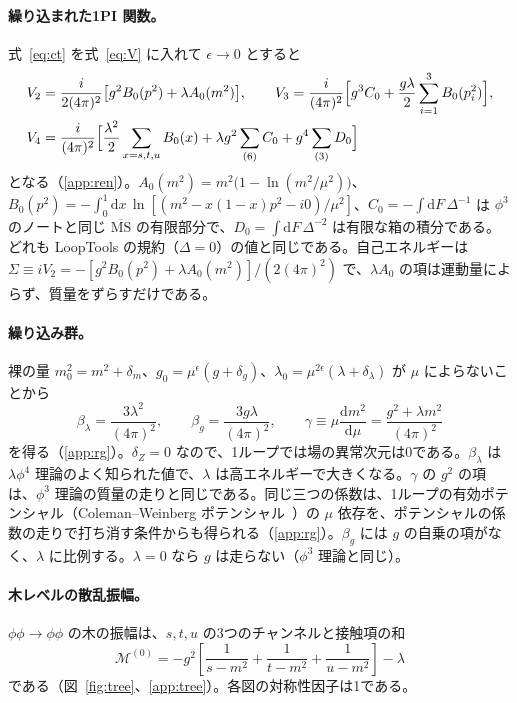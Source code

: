\documentclass[a4paper,10pt]{ltjsarticle}
\newcommand{\dd}{\mathrm{d}}
\begin{document}
\paragraph{繰り込まれた1PI 関数。}式~\eqref{eq:ct} を式~\eqref{eq:V} に入れて $\epsilon\to0$ とすると
\begin{equation}
\begin{aligned}
V_2&=\frac{i}{2(4\pi)^2}\bigl[g^2B_0(p^2)+\lambda A_0(m^2)\bigr],\qquad
V_3=\frac{i}{(4\pi)^2}\Bigl[g^3C_0+\frac{g\lambda}{2}\sum_{i=1}^3B_0(p_i^2)\Bigr],\\
V_4&=\frac{i}{(4\pi)^2}\Bigl[\frac{\lambda^2}{2}\sum_{x=s,t,u}B_0(x)+\lambda g^2\sum_{(6)}C_0+g^4\sum_{(3)}D_0\Bigr]
\end{aligned}
\label{eq:VR}
\end{equation}
となる（\ref{app:ren}）。$A_0(m^2)=m^2\bigl(1-\ln(m^2/\mu^2)\bigr)$、$B_0(p^2)=-\int_0^1\dd x\,\ln[(m^2-x(1-x)p^2-i0)/\mu^2]$、$C_0=-\int\dd F\,\Delta^{-1}$ は $\phi^3$ のノートと同じ $\overline{\mathrm{MS}}$ の有限部分で、$D_0=\int\dd F\,\Delta^{-2}$ は有限な箱の積分である。どれも LoopTools の規約（$\Delta=0$）の値と同じである。自己エネルギーは $\Sigma\equiv iV_2=-[g^2B_0(p^2)+\lambda A_0(m^2)]/(2(4\pi)^2)$ で、$\lambda A_0$ の項は運動量によらず、質量をずらすだけである。

\paragraph{繰り込み群。}裸の量 $m_0^2=m^2+\delta_m$、$g_0=\mu^\epsilon(g+\delta_g)$、$\lambda_0=\mu^{2\epsilon}(\lambda+\delta_\lambda)$ が $\mu$ によらないことから
\begin{equation}
\beta_\lambda=\frac{3\lambda^2}{(4\pi)^2},\qquad
\beta_g=\frac{3g\lambda}{(4\pi)^2},\qquad
\gamma\equiv\mu\frac{\dd m^2}{\dd\mu}=\frac{g^2+\lambda m^2}{(4\pi)^2}
\label{eq:rge}
\end{equation}
を得る（\ref{app:rg}）。$\delta_Z=0$ なので、1ループでは場の異常次元は0である。$\beta_\lambda$ は $\lambda\phi^4$ 理論のよく知られた値で、$\lambda$ は高エネルギーで大きくなる。$\gamma$ の $g^2$ の項は、$\phi^3$ 理論の質量の走りと同じである。同じ三つの係数は、1ループの有効ポテンシャル（Coleman--Weinberg ポテンシャル~\cite{cw}）の $\mu$ 依存を、ポテンシャルの係数の走りで打ち消す条件からも得られる（\ref{app:rg}）。$\beta_g$ には $g$ の自乗の項がなく、$\lambda$ に比例する。$\lambda=0$ なら $g$ は走らない（$\phi^3$ 理論と同じ）。

\paragraph{木レベルの散乱振幅。}$\phi\phi\to\phi\phi$ の木の振幅は、$s,t,u$ の3つのチャンネルと接触項の和
\begin{equation}
\mathcal{M}^{(0)}=-g^2\left[\frac{1}{s-m^2}+\frac{1}{t-m^2}+\frac{1}{u-m^2}\right]-\lambda
\label{eq:Mtree}
\end{equation}
である（図~\ref{fig:tree}、\ref{app:tree}）。各図の対称性因子は1である。
\end{document}
